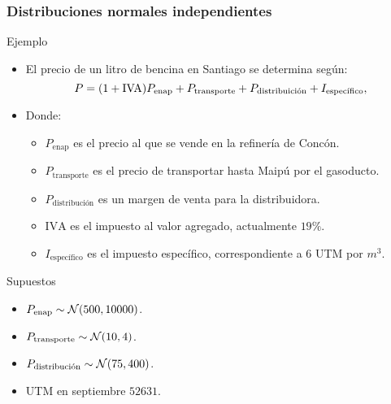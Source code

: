 \documentclass[table]{beamer}
\begin{document}
\begin{frame}
    \frametitle{Distribuciones normales independientes}
    \begin{block}{Ejemplo}
        \begin{itemize}
            \item El precio de un litro de bencina en Santiago se determina según:
                \begin{equation*}
                    P = \parens{1 + \text{IVA}} P_{\text{enap}} + P_{\text{transporte}} + P_{\text{distribuición}} + I_{\text{específico}} ,
                \end{equation*}
            \item Donde:
                \begin{itemize}
                    \item $P_{\text{enap}}$ es el precio al que se vende en la refinería de Concón.
                    \item $P_{\text{transporte}}$ es el precio de transportar hasta Maipú por el gasoducto.
                    \item $P_{\text{distribución}}$ es un margen de venta para la distribuidora.
                    \item $\text{IVA}$ es el impuesto al valor agregado, actualmente $19\%$.
                    \item $I_{\text{específico}}$ es el impuesto específico, correspondiente a $6$ UTM por $m^{3}$.
                \end{itemize}
        \end{itemize}
    \end{block}
    \begin{block}{Supuestos}
        \begin{itemize}
            \item $P_{\text{enap}} \sim \normal{500}{10000}$.
            \item $P_{\text{transporte}} \sim \normal{10}{4}$.
            \item $P_{\text{distribución}} \sim \normal{75}{400}$.
            \item UTM en septiembre $52631$.
        \end{itemize}
    \end{block}
\end{frame}
\end{document}
